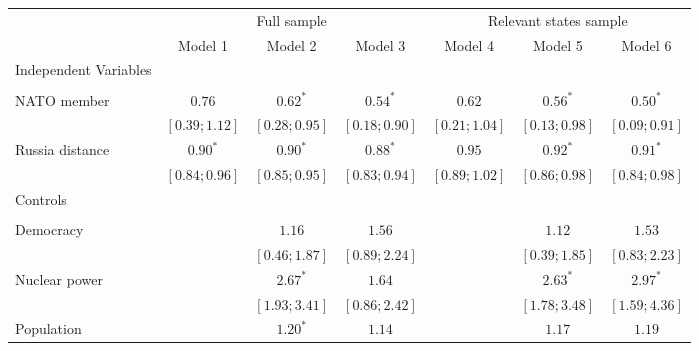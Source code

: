 
\begin{table}[h!]
\begin{center}
\begin{tabular}{l c c c c c c}
\hline
 & \multicolumn{3}{c}{Full sample} & \multicolumn{3}{c}{Relevant states sample} \\
\cline{2-4} \cline{5-7}
 & Model 1 & Model 2 & Model 3 & Model 4 & Model 5 & Model 6 \\
\hline
Independent Variables &                 &                 &                 &                 &                 &                 \\
                      &                 &                 &                 &                 &                 &                 \\
\quad NATO member     & $0.76$          & $0.62^{*}$      & $0.54^{*}$      & $0.62$          & $0.56^{*}$      & $0.50^{*}$      \\
                      & $ [0.39; 1.12]$ & $ [0.28; 0.95]$ & $ [0.18; 0.90]$ & $ [0.21; 1.04]$ & $ [0.13; 0.98]$ & $ [0.09; 0.91]$ \\
\quad Russia distance & $0.90^{*}$      & $0.90^{*}$      & $0.88^{*}$      & $0.95$          & $0.92^{*}$      & $0.91^{*}$      \\
                      & $ [0.84; 0.96]$ & $ [0.85; 0.95]$ & $ [0.83; 0.94]$ & $ [0.89; 1.02]$ & $ [0.86; 0.98]$ & $ [0.84; 0.98]$ \\
Controls              &                 &                 &                 &                 &                 &                 \\
                      &                 &                 &                 &                 &                 &                 \\
\quad Democracy       &                 & $1.16$          & $1.56$          &                 & $1.12$          & $1.53$          \\
                      &                 & $ [0.46; 1.87]$ & $ [0.89; 2.24]$ &                 & $ [0.39; 1.85]$ & $ [0.83; 2.23]$ \\
\quad Nuclear power   &                 & $2.67^{*}$      & $1.64$          &                 & $2.63^{*}$      & $2.97^{*}$      \\
                      &                 & $ [1.93; 3.41]$ & $ [0.86; 2.42]$ &                 & $ [1.78; 3.48]$ & $ [1.59; 4.36]$ \\
\quad Population      &                 & $1.20^{*}$      & $1.14$          &                 & $1.17$          & $1.19$          \\

\end{tabular}
\end{center}
\end{table}
